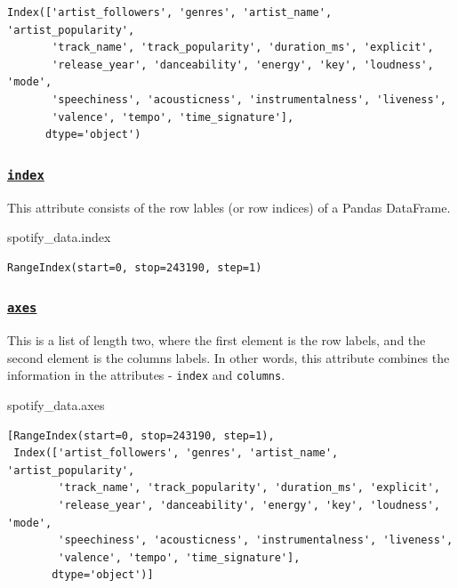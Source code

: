 \documentclass[
  letterpaper,
  DIV=11,
  numbers=noendperiod]{scrreprt}
\newenvironment{Shaded}{\begin{snugshade}}{\end{snugshade}}
\newcommand{\NormalTok}[1]{\textcolor[rgb]{0.00,0.23,0.31}{#1}}
\begin{document}
\begin{verbatim}
Index(['artist_followers', 'genres', 'artist_name', 'artist_popularity',
       'track_name', 'track_popularity', 'duration_ms', 'explicit',
       'release_year', 'danceability', 'energy', 'key', 'loudness', 'mode',
       'speechiness', 'acousticness', 'instrumentalness', 'liveness',
       'valence', 'tempo', 'time_signature'],
      dtype='object')
\end{verbatim}

\hypertarget{index}{%
\subsubsection{\texorpdfstring{\href{https://pandas.pydata.org/docs/reference/api/pandas.Index.html}{\texttt{index}}}{index}}\label{index}}

This attribute consists of the row lables (or row indices) of a Pandas
DataFrame.

\begin{Shaded}
\begin{Highlighting}[]
\NormalTok{spotify\_data.index}
\end{Highlighting}
\end{Shaded}

\begin{verbatim}
RangeIndex(start=0, stop=243190, step=1)
\end{verbatim}

\hypertarget{axes}{%
\subsubsection{\texorpdfstring{\href{https://pandas.pydata.org/docs/reference/api/pandas.DataFrame.axes.html}{\texttt{axes}}}{axes}}\label{axes}}

This is a list of length two, where the first element is the row labels,
and the second element is the columns labels. In other words, this
attribute combines the information in the attributes - \texttt{index}
and \texttt{columns}.

\begin{Shaded}
\begin{Highlighting}[]
\NormalTok{spotify\_data.axes}
\end{Highlighting}
\end{Shaded}

\begin{verbatim}
[RangeIndex(start=0, stop=243190, step=1),
 Index(['artist_followers', 'genres', 'artist_name', 'artist_popularity',
        'track_name', 'track_popularity', 'duration_ms', 'explicit',
        'release_year', 'danceability', 'energy', 'key', 'loudness', 'mode',
        'speechiness', 'acousticness', 'instrumentalness', 'liveness',
        'valence', 'tempo', 'time_signature'],
       dtype='object')]
\end{verbatim}
\end{document}

